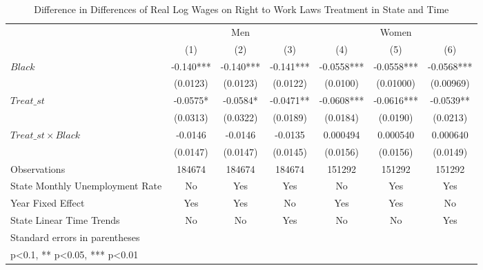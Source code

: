 \begin{table}[htbp]\centering
\def\sym#1{\ifmmode^{#1}\else\(^{#1}\)\fi}
\caption{Difference in Differences of Real Log Wages on Right to Work Laws Treatment in State and Time}
\begin{tabular}{l*{6}{c}}
\hline\hline
                    &\multicolumn{3}{c}{Men}                        &\multicolumn{3}{c}{Women}                      \\\cmidrule(lr){2-4}\cmidrule(lr){5-7}
                    &\multicolumn{1}{c}{(1)}   &\multicolumn{1}{c}{(2)}   &\multicolumn{1}{c}{(3)}   &\multicolumn{1}{c}{(4)}   &\multicolumn{1}{c}{(5)}   &\multicolumn{1}{c}{(6)}   \\
\hline
$ Black $           &      -0.140***&      -0.140***&      -0.141***&     -0.0558***&     -0.0558***&     -0.0568***\\
                    &    (0.0123)   &    (0.0123)   &    (0.0122)   &    (0.0100)   &   (0.01000)   &   (0.00969)   \\
[1em]
$ Treat\_{st} $      &     -0.0575*  &     -0.0584*  &     -0.0471** &     -0.0608***&     -0.0616***&     -0.0539** \\
                    &    (0.0313)   &    (0.0322)   &    (0.0189)   &    (0.0184)   &    (0.0190)   &    (0.0213)   \\
[1em]
$ Treat\_{st} \times Black $&     -0.0146   &     -0.0146   &     -0.0135   &    0.000494   &    0.000540   &    0.000640   \\
                    &    (0.0147)   &    (0.0147)   &    (0.0145)   &    (0.0156)   &    (0.0156)   &    (0.0149)   \\
\hline
Observations        &      184674   &      184674   &      184674   &      151292   &      151292   &      151292   \\
State Monthly Unemployment Rate&          No   &         Yes   &         Yes   &          No   &         Yes   &         Yes   \\
Year Fixed Effect   &         Yes   &         Yes   &          No   &         Yes   &         Yes   &          No   \\
State Linear Time Trends&          No   &          No   &         Yes   &          No   &          No   &         Yes   \\
\hline\hline
\multicolumn{7}{l}{\footnotesize Standard errors in parentheses}\\
\multicolumn{7}{l}{\footnotesize * p<0.1, ** p<0.05, *** p<0.01}\\
\end{tabular}
\end{table}
